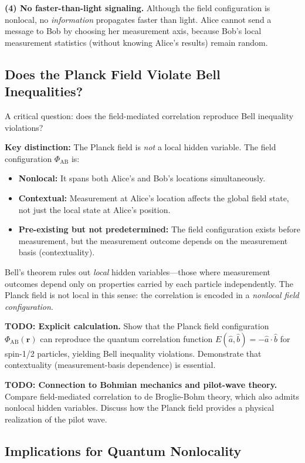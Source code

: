\documentclass[11pt,a4paper]{article}
\theoremstyle{definition}
\theoremstyle{remark}
\begin{document}
\textbf{(4) No faster-than-light signaling.} Although the field configuration is nonlocal, no \emph{information} propagates faster than light. Alice cannot send a message to Bob by choosing her measurement axis, because Bob's local measurement statistics (without knowing Alice's results) remain random.

\subsection{Does the Planck Field Violate Bell Inequalities?}
\label{sec:planck_bell}

A critical question: does the field-mediated correlation reproduce Bell inequality violations?

\textbf{Key distinction:} The Planck field is \emph{not} a local hidden variable. The field configuration $\Phi_{\mathrm{AB}}$ is:
\begin{itemize}[leftmargin=*, itemsep=0.2em]
\item \textbf{Nonlocal:} It spans both Alice's and Bob's locations simultaneously.
\item \textbf{Contextual:} Measurement at Alice's location affects the global field state, not just the local state at Alice's position.
\item \textbf{Pre-existing but not predetermined:} The field configuration exists before measurement, but the measurement outcome depends on the measurement basis (contextuality).
\end{itemize}

Bell's theorem rules out \emph{local} hidden variables---those where measurement outcomes depend only on properties carried by each particle independently. The Planck field is not local in this sense: the correlation is encoded in a \emph{nonlocal field configuration}.

\textbf{TODO: Explicit calculation.} Show that the Planck field configuration $\Phi_{\mathrm{AB}}(\mathbf{r})$ can reproduce the quantum correlation function $E(\hat{a},\hat{b}) = -\hat{a} \cdot \hat{b}$ for spin-1/2 particles, yielding Bell inequality violations. Demonstrate that contextuality (measurement-basis dependence) is essential.

\textbf{TODO: Connection to Bohmian mechanics and pilot-wave theory.} Compare field-mediated correlation to de Broglie-Bohm theory, which also admits nonlocal hidden variables. Discuss how the Planck field provides a physical realization of the pilot wave.

\subsection{Implications for Quantum Nonlocality}
\label{sec:nonlocality_implications}
\end{document}
